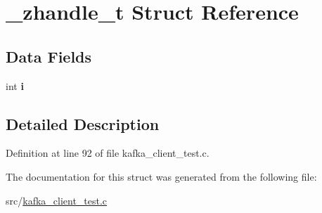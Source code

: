 \hypertarget{struct__zhandle__t}{\section{\-\_\-zhandle\-\_\-t \-Struct \-Reference}
\label{struct__zhandle__t}
}
\subsection*{\-Data \-Fields}
\begin{DoxyCompactItemize}
\item 
\hypertarget{struct__zhandle__t_af11f06d156a6cc2dad65e5e7b09dc91c}{int {\bfseries i}}\label{struct__zhandle__t_af11f06d156a6cc2dad65e5e7b09dc91c}

\end{DoxyCompactItemize}


\subsection{\-Detailed \-Description}


\-Definition at line 92 of file kafka\-\_\-client\-\_\-test.\-c.



\-The documentation for this struct was generated from the following file\-:\begin{DoxyCompactItemize}
\item 
src/\hyperlink{kafka__client__test_8c}{kafka\-\_\-client\-\_\-test.\-c}\end{DoxyCompactItemize}
